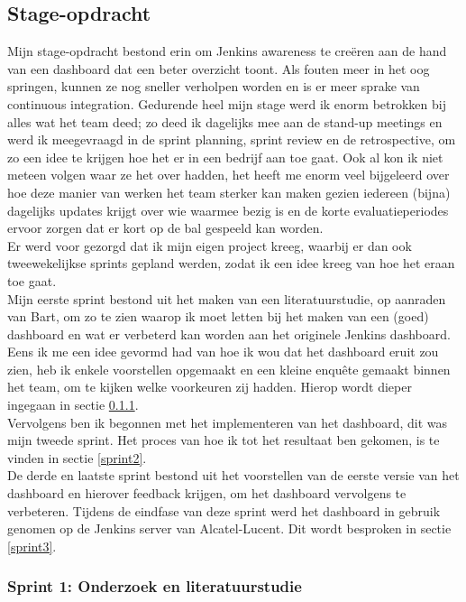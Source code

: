 \documentclass[10pt,a4paper]{article}
\begin{document}
\subsection{Stage-opdracht}
Mijn stage-opdracht bestond erin om Jenkins awareness te cre\"eren aan de hand van een dashboard dat een beter overzicht toont.
Als fouten meer in het oog springen, kunnen ze nog sneller verholpen worden en is er meer sprake van continuous integration.  Gedurende heel mijn stage werd ik enorm betrokken bij alles wat het team deed; zo deed ik dagelijks mee aan de stand-up meetings en werd ik meegevraagd in de sprint planning, sprint review en de retrospective, om zo een idee te krijgen hoe het er in een bedrijf aan toe gaat. Ook al kon ik niet meteen volgen waar ze het over hadden, het heeft me enorm veel bijgeleerd over hoe deze manier van werken het team sterker kan maken gezien iedereen (bijna) dagelijks updates krijgt over wie waarmee bezig is en de korte evaluatieperiodes ervoor zorgen dat er kort op de bal gespeeld kan worden.\\
Er werd voor gezorgd dat ik mijn eigen project kreeg, waarbij er dan ook tweewekelijkse sprints gepland werden, zodat ik een idee kreeg van hoe het eraan toe gaat.\\
Mijn eerste sprint bestond uit het maken van een literatuurstudie, op aanraden van Bart, om zo te zien waarop ik moet letten bij het maken van een (goed) dashboard en wat er verbeterd kan worden aan het originele Jenkins dashboard. Eens ik me een idee gevormd had van hoe ik wou dat het dashboard eruit zou zien, heb ik enkele voorstellen opgemaakt en een kleine enqu\^ete gemaakt binnen het team, om te kijken welke voorkeuren zij hadden. Hierop wordt dieper ingegaan in sectie \ref{sprint1}.\\
Vervolgens ben ik begonnen met het implementeren van het dashboard, dit was mijn tweede sprint. Het proces van hoe ik tot het resultaat ben gekomen, is te vinden in sectie \ref{sprint2}.\\
De derde en laatste sprint bestond uit het voorstellen van de eerste versie van het dashboard en hierover feedback krijgen, om het dashboard vervolgens te verbeteren. Tijdens de eindfase van deze sprint werd het dashboard in gebruik genomen op de Jenkins server van Alcatel-Lucent. Dit wordt besproken in sectie \ref{sprint3}.

\subsubsection{Sprint 1: Onderzoek en literatuurstudie} 
\label{sprint1}
\end{document}
